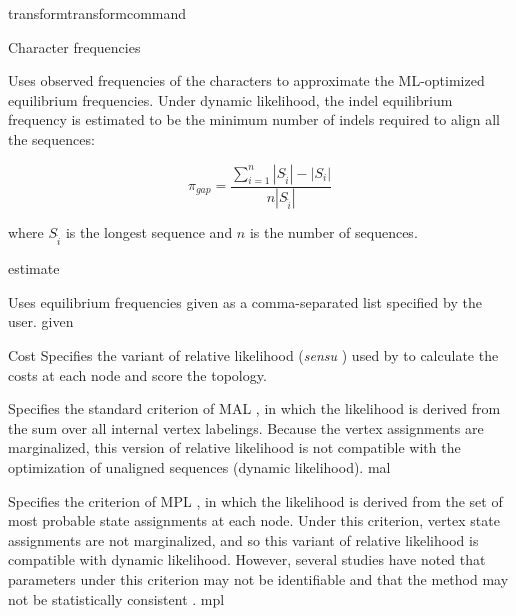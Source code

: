 \begin{command}{transform}{transformcommand}
\begin{arguments}
\begin{argumentgroup} {Character frequencies}
                {Uses observed frequencies of the characters to
                approximate the ML-optimized equilibrium
                frequencies.  Under dynamic likelihood, the indel
                equilibrium frequency is estimated to be the minimum
                number of indels required to align all the
                sequences: 
                
                \begin{equation*}
                    \pi_{gap} = \frac{\sum_{i=1}^n
                    |S_{\hat{i}}| - |S_i|}{n |S_{\hat{i}}|}
                \end{equation*}
                
                where $S_{\hat{i}}$ is the longest sequence and $n$ is the number of sequences.}
                {estimate}

                {Uses equilibrium frequencies given as a
                comma-separated list specified by the user.} 
                {given}

        \end{argumentgroup}

        \begin {argumentgroup} {Cost}
            Specifies the variant of relative likelihood (\textit{sensu}
            \cite{steel2000parsimony}) used by \poy to calculate the costs at
            each node and score the topology.

                {Specifies the standard criterion of MAL \cite{felsenstein1981}, in which the
                likelihood is derived from the sum over all internal
                vertex labelings. Because the vertex assignments are
                marginalized, this version of relative likelihood is not
                compatible with the optimization of unaligned sequences (dynamic likelihood).}
                {mal}

                {Specifies the criterion of MPL \cite{barryandhartigan1987}, in which the likelihood is
                derived from the set of most probable state assignments
                at each node. Under this criterion, vertex state
                assignments are not marginalized, and so this variant of
                relative likelihood is compatible with dynamic
                likelihood. However, several studies have noted that
                parameters under this criterion may not be identifiable
                \cite{zou2011} and that the method may not be statistically consistent
                \cite{mossel2009shrinkage}.}
                {mpl}
    

\end{argumentgroup}
\end{arguments}
\end{command}
